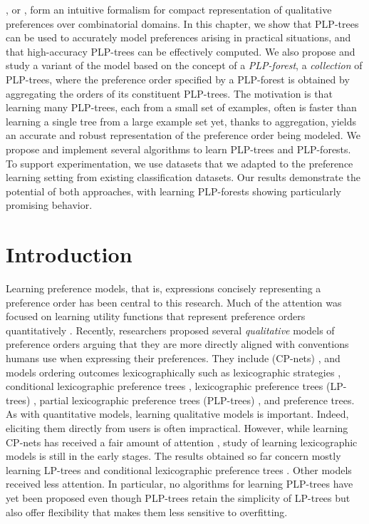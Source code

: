 , or , form
an intuitive formalism for compact representation of qualitative 
preferences over combinatorial domains. 
In this chapter, we show that PLP-trees can be 
used to accurately model preferences arising in practical situations, and 
that high-accuracy PLP-trees can be effectively computed. We also propose 
and study a variant of the model based on the concept of a \emph{PLP-forest},
a \emph{collection} of PLP-trees, where the preference order specified by a 
PLP-forest is obtained by aggregating the orders of its constituent PLP-trees. 
The motivation is that learning many PLP-trees, each from a small set of 
examples, often is faster than learning a single tree from a large example
set yet, thanks to aggregation, yields an accurate and robust representation 
of the preference order being modeled. We propose and implement several algorithms 
to learn PLP-trees and PLP-forests. To support experimentation, we use 
datasets that we adapted to the preference learning setting from existing 
classification datasets.
Our results demonstrate the potential of both approaches, with learning 
PLP-forests showing particularly promising behavior.


\section{Introduction}
Learning
preference models, that is, expressions concisely representing a 
preference order has been central to this research. Much of the 
attention was focused on learning utility functions that represent
preference orders quantitatively \cite{furnkranz2011preference}.
Recently, researchers proposed several \emph{qualitative} models of preference 
orders arguing that they are more directly aligned with conventions humans 
use when expressing their preferences. They include  (CP-nets)
\cite{boutilier2004cp}, and models ordering outcomes lexicographically 
such as lexicographic strategies \cite{schmitt2006complexity}, conditional 
lexicographic preference trees \cite{brauning2012learning}, lexicographic preference 
trees (LP-trees) \cite{booth:learningLP}, partial lexicographic preference
trees (PLP-trees)
\cite{conf/aaai15/LiuT}, and preference trees\cite{fraser1994ordinal,%
liu2015reasoning}. As with quantitative models, learning qualitative
models is important. Indeed, eliciting them directly from users is often 
impractical. However, while learning CP-nets has received a fair amount 
of attention \cite{lang2009complexity,dimopoulos2009ceteris,
koriche2010learning,guerin2013learning}, study of learning lexicographic 
models is still in the early stages. The results obtained so far concern mostly 
learning LP-trees \cite{booth:learningLP} and 
conditional lexicographic preference trees \cite{brauning2012learning}. 
Other models received less attention. In particular, no algorithms for
learning PLP-trees have yet been proposed even though
PLP-trees retain the simplicity of LP-trees but also offer flexibility
that makes them less sensitive to overfitting. 

